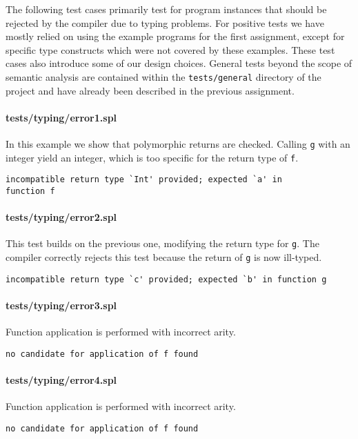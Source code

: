 \documentclass[a4paper]{article}
\begin{document}
The following test cases primarily test for program instances that should be rejected by the compiler due to typing problems.
For positive tests we have mostly relied on using the example programs for the first assignment, except for specific type constructs which were not covered by these examples.
These test cases also introduce some of our design choices.
General tests beyond the scope of semantic analysis are contained within the \verb|tests/general| directory of the project and have already been described in the previous assignment.

\paragraph{tests/typing/error1.spl}
In this example we show that polymorphic returns are checked.
Calling \verb|g| with an integer yield an integer, which is too specific for the return type of \verb|f|.
    \begin{verbatim}
incompatible return type `Int' provided; expected `a' in
function f\end{verbatim}

\paragraph{tests/typing/error2.spl}
This test builds on the previous one, modifying the return type for \verb|g|.
The compiler correctly rejects this test because the return of \verb|g| is now ill-typed.
    \begin{verbatim}
incompatible return type `c' provided; expected `b' in function g\end{verbatim}

\paragraph{tests/typing/error3.spl}
Function application is performed with incorrect arity.
    \begin{verbatim}
no candidate for application of f found\end{verbatim}

\paragraph{tests/typing/error4.spl}
Function application is performed with incorrect arity.
    \begin{verbatim}
no candidate for application of f found\end{verbatim}
\end{document}
